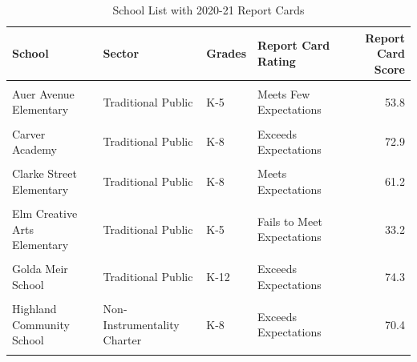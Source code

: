 \documentclass[
]{article}
\begin{document}
\begin{longtable}[t]{>{\raggedright\arraybackslash}p{10em}ll>{\raggedright\arraybackslash}p{10em}r}
\caption{\label{tab:unnamed-chunk-4}School List with 2020-21 Report Cards}\\
\toprule
School & Sector & Grades & Report Card Rating & Report Card Score\\
\midrule
\cellcolor{gray!6}{Alliance School of Milwaukee} & \cellcolor{gray!6}{Instrumentality Charter} & \cellcolor{gray!6}{9-12} & \cellcolor{gray!6}{Alternate Rating - Needs Improvement} & \cellcolor{gray!6}{NA}\\
Auer Avenue Elementary & Traditional Public & K-5 & Meets Few Expectations & 53.8\\
\cellcolor{gray!6}{Brown Street Academy} & \cellcolor{gray!6}{Traditional Public} & \cellcolor{gray!6}{K-5} & \cellcolor{gray!6}{Meets Few Expectations} & \cellcolor{gray!6}{55.7}\\
Carver Academy & Traditional Public & K-8 & Exceeds Expectations & 72.9\\
\cellcolor{gray!6}{Clara Mohammed School} & \cellcolor{gray!6}{Private} & \cellcolor{gray!6}{K-12} & \cellcolor{gray!6}{NR-DATA} & \cellcolor{gray!6}{NA}\\
\addlinespace
Clarke Street Elementary & Traditional Public & K-8 & Meets Expectations & 61.2\\
\cellcolor{gray!6}{Cross Trainers Academy} & \cellcolor{gray!6}{Private} & \cellcolor{gray!6}{K-12} & \cellcolor{gray!6}{Meets Expectations} & \cellcolor{gray!6}{69.2}\\
Elm Creative Arts Elementary & Traditional Public & K-5 & Fails to Meet Expectations & 33.2\\
\cellcolor{gray!6}{Franklin Elementary} & \cellcolor{gray!6}{Traditional Public} & \cellcolor{gray!6}{K-8} & \cellcolor{gray!6}{Meets Expectations} & \cellcolor{gray!6}{62.7}\\
Golda Meir School & Traditional Public & K-12 & Exceeds Expectations & 74.3\\
\addlinespace
\cellcolor{gray!6}{Grant Gordon Learning Center} & \cellcolor{gray!6}{Traditional Public} & \cellcolor{gray!6}{K-5} & \cellcolor{gray!6}{NA} & \cellcolor{gray!6}{NA}\\
Highland Community School & Non-Instrumentality Charter & K-8 & Exceeds Expectations & 70.4\\
\cellcolor{gray!6}{Holmes Elementary} & \cellcolor{gray!6}{Traditional Public} & \cellcolor{gray!6}{K-8} & \cellcolor{gray!6}{Meets Expectations} & \cellcolor{gray!6}{60.7}\\

\end{longtable}
\end{document}

